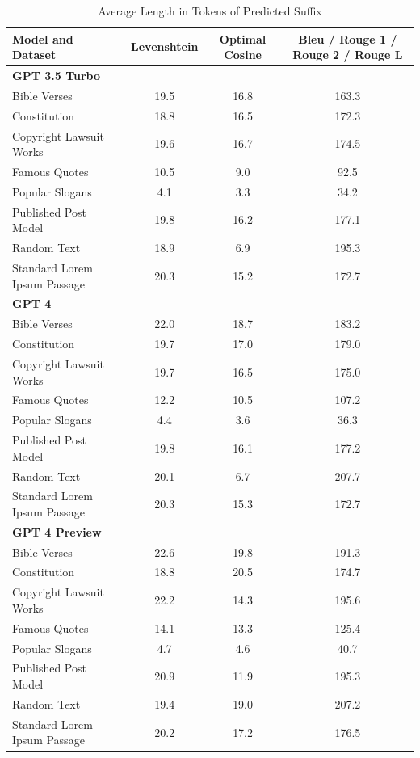 \documentclass{article}
\begin{document}
\begin{table}[htbp]
    \centering
    \caption{Average Length in Tokens of Predicted Suffix}
    \begin{tabular}{lccc}
        \toprule
        Model and Dataset & Levenshtein & Optimal Cosine & Bleu / Rouge 1 / Rouge 2 / Rouge L\\
        \midrule
        \multicolumn{4}{l}{\textbf{GPT 3.5 Turbo}} \\
        \midrule
        Bible Verses & 19.5 & 16.8 & 163.3\\
        Constitution & 18.8 & 16.5 & 172.3\\
        Copyright Lawsuit Works & 19.6 & 16.7 & 174.5  \\
        Famous Quotes & 10.5 & 9.0 & 92.5 \\
        Popular Slogans & 4.1 & 3.3 & 34.2  \\
        Published Post Model & 19.8 & 16.2 & 177.1 \\
        Random Text & 18.9 & 6.9 & 195.3 \\
	Standard Lorem Ipsum Passage & 20.3 & 15.2 & 172.7 \\


        \midrule
        \multicolumn{4}{l}{\textbf{GPT 4}} \\
        \midrule
        Bible Verses & 22.0 & 18.7 & 183.2  \\
        Constitution & 19.7 & 17.0 & 179.0 \\
        Copyright Lawsuit Works & 19.7 & 16.5 & 175.0 \\
        Famous Quotes & 12.2 & 10.5 & 107.2  \\
        Popular Slogans & 4.4 & 3.6 & 36.3 \\
        Published Post Model & 19.8 & 16.1 & 177.2 \\
        Random Text & 20.1 & 6.7 & 207.7 \\
        Standard Lorem Ipsum Passage & 20.3 & 15.3 & 172.7 \\


        \midrule
        \multicolumn{4}{l}{\textbf{GPT 4 Preview}} \\
        \midrule
        Bible Verses & 22.6 & 19.8 & 191.3 \\
        Constitution & 18.8 & 20.5 & 174.7  \\
        Copyright Lawsuit Works & 22.2 & 14.3 & 195.6 \\
        Famous Quotes & 14.1 & 13.3 & 125.4 \\
        Popular Slogans & 4.7 & 4.6 & 40.7 \\
        Published Post Model & 20.9 & 11.9 & 195.3 \\
        Random Text & 19.4 & 19.0 & 207.2 \\
        Standard Lorem Ipsum Passage & 20.2 & 17.2 & 176.5 \\


        \bottomrule
    \end{tabular}
    \label{tab:avg_values}
\end{table}
\end{document}
